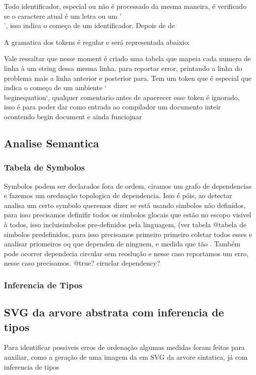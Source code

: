 Todo identificador, especial ou não é processado da mesma maneira, é verificado se o caractere atual é um letra ou um '\\', isso indica o começo 
de um identificador. Depois de de

A gramatica dos tokens é regular e será representada abaixio:


Vale ressaltar que nesse moment é criado uma tabela que mapeia cada numero de linha à um string dessa mesma linha, para reportar error, printando a linha do problema mais a linha anterior e posterior para.
Tem um token que é especial que indica o começo de um ambiente `\\begin{equation}`, qualquer comentario antes de apaerecer esse token é ignorado, isso é para poder dar como entrada ao compilador um documento inteir ocontendo begin document e ainda funciojnar



\subsection{Analise Semantica}

\subsubsection{Tabela de Symbolos}
Symbolos podem ser declarados fora de ordem, ciramos um grafo de dependencias e fazemos um orednação topologica de dependencia.
Isso é póis, ao detectar analisa um certo symbolo queremos dizer se está usando simbolos não definidos, para isso precisamos definifir todos os simbolos glocais que estão no escopo visivel à todos, isso incluisimbolos pre-definidos pela linguagem, (ver tabela @{tabela de simbolos predefinidos}, para isso precisamos primeiro primeiro coletar todos esses e analisar priomeiros oq que dependen de ninguem, e medida que tão
. Também pode ocorrer dependecia circular sem reoslução e nesse caso reportamos um erro, nesse caso precisamos. @{true? ciruclar dependency?}

\subsubsection{Inferencia de Tipos}

\subsection{SVG da arvore abstrata com inferencia de tipos}
Para identificar possiveis erros de ordenação algumas medidas foram feitas para auxiliar, como a geração de uma imagem da 
em SVG da arvore sintatica, já com inferencia de tipos


